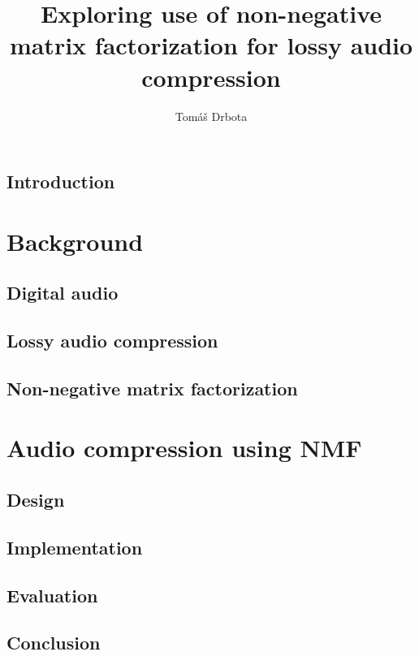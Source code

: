 \documentclass[thesis=M,english,hidelinks]{FITthesis}[2018/03/12]
\title{Exploring use of non-negative matrix factorization for lossy audio compression}
\author{Tomáš Drbota} %
\begin{document}
\chapter{Introduction}



\part{Background}
\chapter{Digital audio}


\chapter{Lossy audio compression}


\chapter{Non-negative matrix factorization}


\part{Audio compression using NMF}
\chapter{Design}


\chapter{Implementation}


\chapter{Evaluation}


\chapter{Conclusion}




\end{document}
